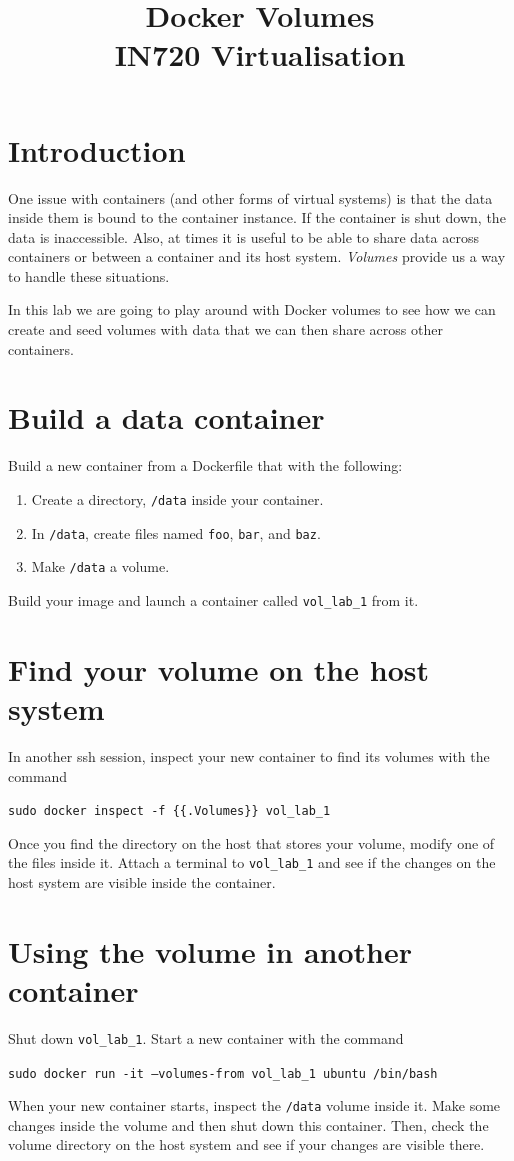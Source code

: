 \documentclass{article}
\begin{document}
\title{Docker Volumes\\ IN720 Virtualisation}
\date{}
\maketitle

\section*{Introduction}
One issue with containers (and other forms of virtual systems) is that the data inside them is bound to the container instance.  If the container is shut down, the data is inaccessible. Also, at times it is useful to be able to share data across containers or between a container and its host system.  \emph{Volumes} provide us a way to handle these situations.

In this lab we are going to play around with Docker volumes to see how we can create and seed volumes with data that we can then share across other containers.


\section{Build a data container}
Build a new container from a Dockerfile that with the following:

\begin{enumerate}
	\item Create a directory, \texttt{/data} inside your container.
	\item In \texttt{/data}, create files named \texttt{foo}, \texttt{bar}, and \texttt{baz}.
	\item Make \texttt{/data} a volume.
\end{enumerate}

Build your image and launch a container called \texttt{vol\_lab\_1} from it.


\section{Find your volume on the host system}
In another ssh session, inspect your new container to find its volumes with the command

\texttt{sudo docker inspect -f \{\{.Volumes\}\} vol\_lab\_1}

Once you find the directory on the host that stores your volume, modify one of the files inside it.  Attach a terminal to \texttt{vol\_lab\_1} and see if the changes on the host system are visible inside the container.

\section{Using the volume in another container}
Shut down \texttt{vol\_lab\_1}.  Start a new container with the command

\texttt{sudo docker run -it  --volumes-from vol\_lab\_1 ubuntu /bin/bash}

When your new container starts, inspect the \texttt{/data} volume inside it.  Make some changes inside the volume and then shut down this container.  Then, check the volume directory on the host system and see if your changes are visible there.
\end{document}
